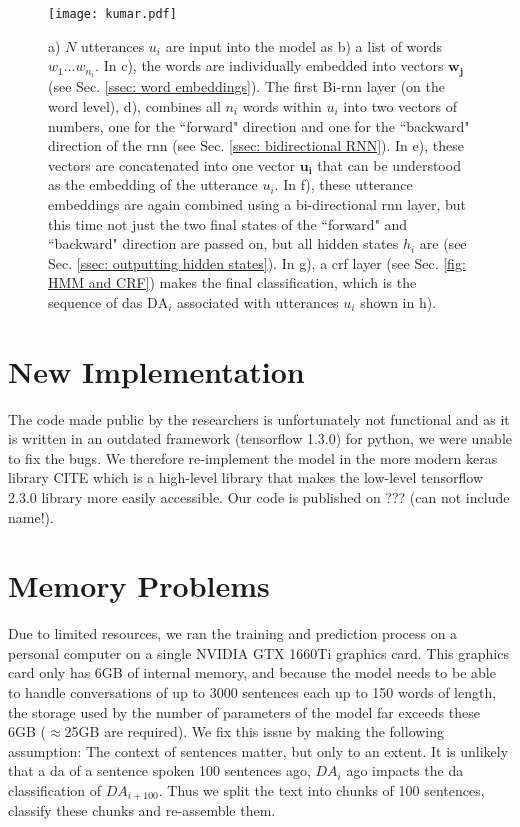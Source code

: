     \begin{figure}[h]
        \centering
        \texttt{[image: kumar.pdf]}
        \caption{a) $N$ \glspl{utterance} $u_i$ are input into the \gls{model} as b) a list of words $w_1 \dots w_{n_i}$. In c), the words are individually embedded into vectors $\mathbf{w_j}$ (see Sec. \ref{ssec: word embeddings}). The first Bi-\gls{rnn} layer (on the word level), d), combines all $n_i$ words within $u_i$ into two vectors of numbers, one for the ``forward" direction and one for the ``backward" direction of the \gls{rnn} (see Sec. \ref{ssec: bidirectional RNN}). In e), these vectors are concatenated into one vector $\mathbf{u_i}$ that can be understood as the \gls{embedding} of the \gls{utterance} $u_i$. In f), these \gls{utterance} \glspl{embedding} are again combined using a bi-directional \gls{rnn} layer, but this time not just the two final states of the ``forward" and ``backward" direction are passed on, but all hidden states $h_i$ are (see Sec. \ref{ssec: outputting hidden states}). In g), a \gls{crf} layer (see Sec. \ref{fig: HMM and CRF}) makes the final classification, which is the sequence of \glspl{da} $\text{DA}_i$ associated with \glspl{utterance} $u_i$ shown in h).}
        \label{fig:kumar_model}
    \end{figure}

    \section{New Implementation}
        The code made public by the researchers is unfortunately not functional and as it is written in an outdated framework (tensorflow 1.3.0) for python, we were unable to fix the bugs. We therefore re-implement the \gls{model} in the more modern keras library CITE which is a high-level library that makes the low-level tensorflow 2.3.0 library more easily accessible. Our code is published on ??? (can not include name!).

    \section{Memory Problems}
        Due to limited resources, we ran the training and prediction process on a personal computer on a single NVIDIA GTX 1660Ti graphics card. This graphics card only has 6GB of internal memory, and because the \gls{model} needs to be able to handle conversations of up to 3000 sentences each up to 150 words of length, the storage used by the number of parameters of the \gls{model} far exceeds these 6GB ($\approx$25GB are required). We fix this issue by making the following assumption: The context of sentences matter, but only to an extent. It is unlikely that a \gls{da} of a sentence spoken 100 sentences ago, $DA_{i}$ ago impacts the \gls{da} classification of  $DA_{i + 100}$. Thus we split the text into chunks of 100 sentences, classify these chunks and re-assemble them.


